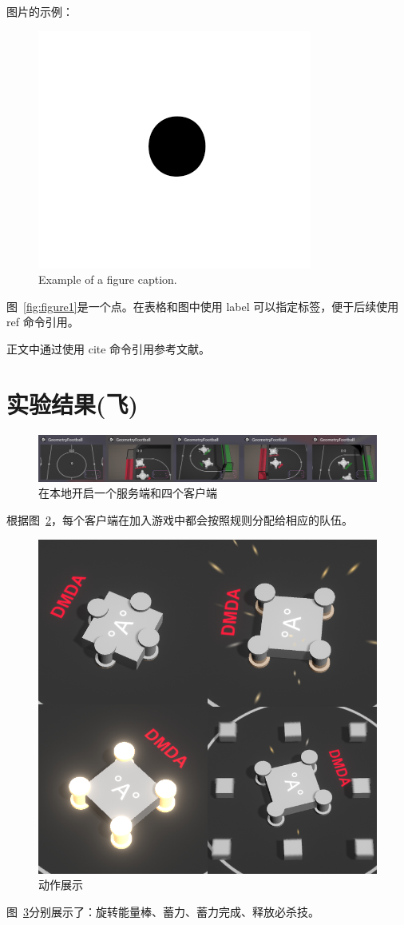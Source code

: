 \documentclass[conference]{IEEEtran}
\begin{document}
图片的示例：
\begin{figure}[htbp]
\centerline{\includegraphics{images/fig1.png}}
\caption{Example of a figure caption.}
\label{fig:figure-1}
\end{figure}
图~\ref{fig:figure1}是一个点。在表格和图中使用 label 可以指定标签，便于后续使用 ref 命令引用。


正文中通过使用 cite 命令引用参考文献。

\newpage
\section{实验结果(飞)}

\begin{figure}[htbp]
  \centerline{\includegraphics[width=.46\textwidth]{images/result1.png}}
  \caption{在本地开启一个服务端和四个客户端}
  \label{fig:result1}
\end{figure}
  根据图~\ref{fig:result1}，每个客户端在加入游戏中都会按照规则分配给相应的队伍。

\begin{figure}[htbp]
  \centerline{\includegraphics[width=.32\textwidth]{images/result2.png}}
  \caption{动作展示}
  \label{fig:result2}
\end{figure}
  图~\ref{fig:result2}分别展示了：旋转能量棒、蓄力、蓄力完成、释放必杀技。
\end{document}

